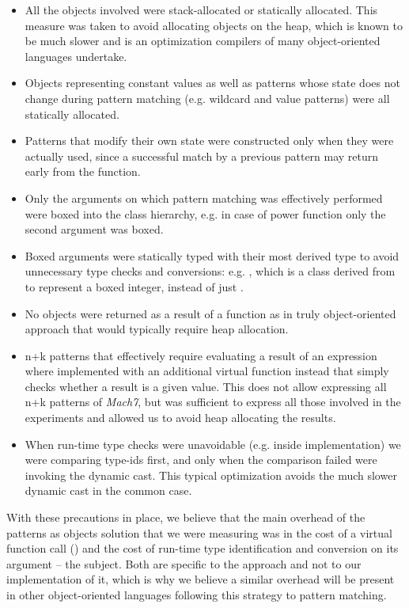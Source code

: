 \begin{itemize}
\setlength{\itemsep}{0pt}
\setlength{\parskip}{0pt}
\item All the objects involved were stack-allocated or statically allocated. 
      This measure was taken to avoid allocating objects on the heap, which is 
      known to be much slower and is an optimization compilers of many 
      object-oriented languages undertake.
\item Objects representing constant values as well as patterns whose state 
      does not change during pattern matching (e.g. wildcard and value patterns) 
      were all statically allocated.
\item Patterns that modify their own state were constructed only when they were 
      actually used, since a successful match by a previous pattern may return 
      early from the function.
\item Only the arguments on which pattern matching was effectively performed 
      were boxed into the  class hierarchy, e.g. in case of power 
      function only the second argument was boxed.
\item Boxed arguments were statically typed with their most derived type to 
      avoid unnecessary type checks and conversions: e.g. , 
      which is a class derived from  to represent a boxed integer, 
      instead of just .
\item No objects were returned as a result of a function as in truly 
      object-oriented approach that would typically require heap allocation.
\item n+k patterns that effectively require evaluating a result of an expression 
      where implemented with an additional virtual function instead that simply
      checks whether a result is a given value. This does not allow expressing
      all n+k patterns of \emph{Mach7}, but was sufficient to express all those 
      involved in the experiments and allowed us to avoid heap allocating the 
      results. 
\item When run-time type checks were unavoidable (e.g. inside  
      implementation) we were comparing type-ids first, and only when the 
      comparison failed were invoking the dynamic cast. This typical 
      optimization avoids the much slower dynamic cast in the common case.
\end{itemize}

\noindent
With these precautions in place, we believe that the main overhead of the 
patterns as objects solution that we were measuring was in the cost of a virtual 
function call () and the cost of run-time type 
identification and conversion on its argument -- the subject. Both are specific 
to the approach and not to our implementation of it, which is why we believe a 
similar overhead will be present in other object-oriented languages following 
this strategy to pattern matching.

